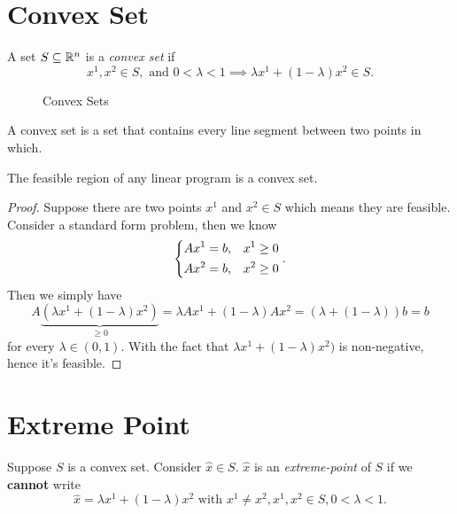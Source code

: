 \section{Convex Set}
\begin{definition}
	A set \(S\subseteq \mathbb{\MakeUppercase{R}}^n\) is a \emph{convex set} if
	\[
		x^1, x^2\in S, \text{ and }0<\lambda<1 \implies \lambda x^1 + (1-\lambda)x^2 \in S.
	\]
\end{definition}

\begin{figure}[H]
	\centering
	\caption{Convex Sets}
	\label{fig:convex-set}
\end{figure}

\begin{intuition}
	A convex set is a set that contains every line segment between two points in which.
\end{intuition}

\begin{remark}
	The feasible region of any linear program is a convex set.
\end{remark}
\begin{proof}
	Suppose there are two points \(x^1\) and \(x^2\in S\) which means they are feasible. Consider a standard form problem, then we know
	\[
		\begin{dcases}
			Ax^1 = b, & x^1\geq 0 \\
			Ax^2 = b, & x^2\geq 0 \\
		\end{dcases}.
	\]
	Then we simply have
	\[
		A\underbrace{(\lambda x^1 + (1-\lambda)x^2)}_{\geq 0} = \lambda A x^1 + (1-\lambda)A x^2 = (\lambda + (1-\lambda))b = b
	\]
	for every \(\lambda \in (0,1)\). With the fact that \(\lambda x^1 + (1-\lambda)x^2)\) is non-negative, hence it's feasible.
\end{proof}

\section{Extreme Point}
\begin{definition}
	Suppose \(S\) is a convex set. Consider \(\hat{x} \in S\). \(\hat{x}\) is an \emph{extreme-point} of \(S\) if we \textbf{cannot} write
	\[
		\hat{x} = \lambda x^1 + (1-\lambda)x^2 \text{ with }x^1 \neq x^2, x^1, x^2\in S, 0<\lambda<1.
	\]
\end{definition}

